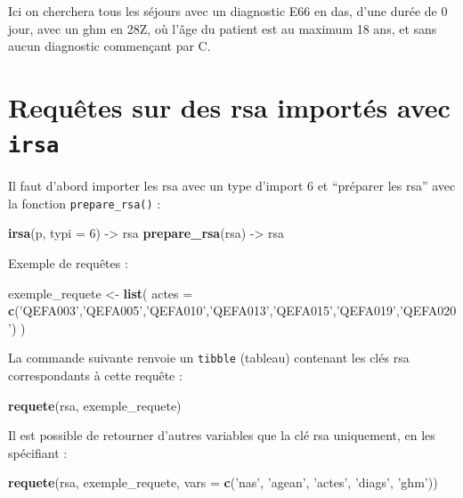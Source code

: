 \documentclass[]{book}
\newenvironment{Shaded}{\begin{snugshade}}{\end{snugshade}}
\newcommand{\KeywordTok}[1]{\textcolor[rgb]{0.13,0.29,0.53}{\textbf{#1}}}
\newcommand{\DataTypeTok}[1]{\textcolor[rgb]{0.13,0.29,0.53}{#1}}
\newcommand{\DecValTok}[1]{\textcolor[rgb]{0.00,0.00,0.81}{#1}}
\newcommand{\StringTok}[1]{\textcolor[rgb]{0.31,0.60,0.02}{#1}}
\newcommand{\NormalTok}[1]{#1}
\theoremstyle{definition}
\theoremstyle{definition}
\theoremstyle{definition}
\theoremstyle{remark}
\begin{document}
Ici on cherchera tous les séjours avec un diagnostic E66 en das, d'une
durée de 0 jour, avec un ghm en 28Z, où l'âge du patient est au maximum
18 ans, et sans aucun diagnostic commençant par C.

\section{\texorpdfstring{Requêtes sur des rsa importés avec
\texttt{irsa}}{Requêtes sur des rsa importés avec irsa}}\label{requetes-sur-des-rsa-importes-avec-irsa}

Il faut d'abord importer les rsa avec un type d'import 6 et ``préparer
les rsa'' avec la fonction \texttt{prepare\_rsa()} :

\begin{Shaded}
\begin{Highlighting}[]
\KeywordTok{irsa}\NormalTok{(p, }\DataTypeTok{typi =} \DecValTok{6}\NormalTok{) ->}\StringTok{ }\NormalTok{rsa}
\KeywordTok{prepare_rsa}\NormalTok{(rsa) ->}\StringTok{ }\NormalTok{rsa}
\end{Highlighting}
\end{Shaded}

Exemple de requêtes :

\begin{Shaded}
\begin{Highlighting}[]
\NormalTok{exemple_requete <-}\StringTok{ }\KeywordTok{list}\NormalTok{(}
  \DataTypeTok{actes =} \KeywordTok{c}\NormalTok{(}\StringTok{'QEFA003'}\NormalTok{,}\StringTok{'QEFA005'}\NormalTok{,}\StringTok{'QEFA010'}\NormalTok{,}\StringTok{'QEFA013'}\NormalTok{,}\StringTok{'QEFA015'}\NormalTok{,}\StringTok{'QEFA019'}\NormalTok{,}\StringTok{'QEFA020'}\NormalTok{)}
\NormalTok{)}
\end{Highlighting}
\end{Shaded}

La commande suivante renvoie un \texttt{tibble} (tableau) contenant les
clés rsa correspondants à cette requête :

\begin{Shaded}
\begin{Highlighting}[]
\KeywordTok{requete}\NormalTok{(rsa, exemple_requete)}
\end{Highlighting}
\end{Shaded}

Il est possible de retourner d'autres variables que la clé rsa
uniquement, en les spécifiant :

\begin{Shaded}
\begin{Highlighting}[]
\KeywordTok{requete}\NormalTok{(rsa, exemple_requete, }\DataTypeTok{vars =} \KeywordTok{c}\NormalTok{(}\StringTok{'nas'}\NormalTok{, }\StringTok{'agean'}\NormalTok{, }\StringTok{'actes'}\NormalTok{, }\StringTok{'diags'}\NormalTok{, }\StringTok{'ghm'}\NormalTok{))}
\end{Highlighting}
\end{Shaded}
\end{document}
